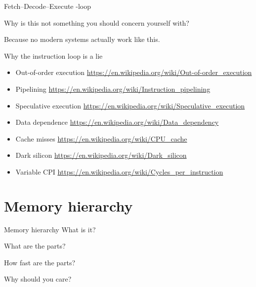 \documentclass[11pt, aspectratio=169, table]{beamer}
\begin{document}
\begin{frame}{Fetch--Decode--Execute -loop}
\setlength{\parskip}{\fill}

Why is this not something you should concern yourself with?

\pause
Because \alert{no} modern systems \alert{actually} work like this.
\end{frame}

\begin{frame}{Why the instruction loop is a lie}
\pause
\begin{itemize}
\item \alert{Out-of-order execution} \url{https://en.wikipedia.org/wiki/Out-of-order_execution}
\item \alert{Pipelining} \url{https://en.wikipedia.org/wiki/Instruction_pipelining}
\item \alert{Speculative execution} \url{https://en.wikipedia.org/wiki/Speculative_execution}
\item \alert{Data dependence} \url{https://en.wikipedia.org/wiki/Data_dependency}
\item \alert{Cache misses} \url{https://en.wikipedia.org/wiki/CPU_cache}
\item \alert{Dark silicon} \url{https://en.wikipedia.org/wiki/Dark_silicon}
\item \alert{Variable CPI} \url{https://en.wikipedia.org/wiki/Cycles_per_instruction}
\end{itemize}
\end{frame}

\section{Memory hierarchy}
\begin{frame}{Memory hierarchy}
\setlength{\parskip}{\fill}
What is it?

What are the parts?

How fast are the parts?

Why should \alert{you} care?
\end{frame}
\end{document}
